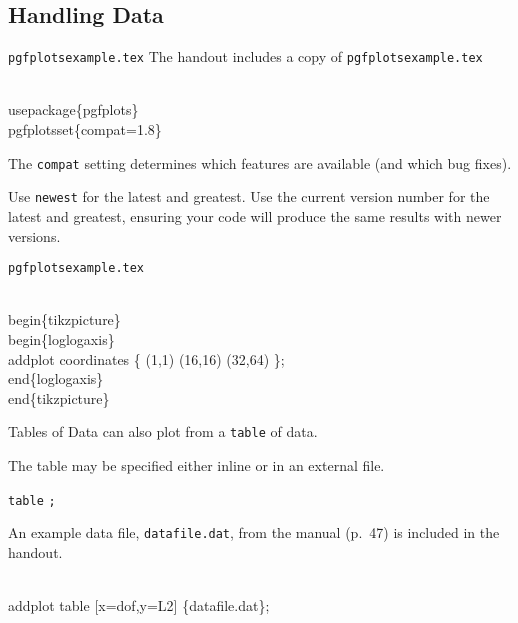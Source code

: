 \subsection{Handling Data}

\begin{frame}[fragile]{\texttt{pgfplotsexample.tex}}
  The handout includes a copy of \texttt{pgfplotsexample.tex}
  \begin{semiverbatim}
    \\usepackage\{pgfplots\}
    \\pgfplotsset\{compat=1.8\}
  \end{semiverbatim}
  The \verb|compat| setting determines which features are available (and which bug fixes).

  Use \verb|newest| for the latest and greatest.
%
  Use the current version number for the latest and greatest, ensuring your code will produce the same results with newer versions.
\end{frame}



\begin{frame}[fragile]{\texttt{pgfplotsexample.tex}}
  \begin{semiverbatim}
    \alert<2>{\\begin\{tikzpicture\}}
      \alert<3>{\\begin\{loglogaxis\}}
        \alert<4>{\\addplot} \alert<5>{coordinates} \alert<6>{\{
          (1,1)
          (16,16)
          (32,64)
        \}}\alert<7>{;}
      \alert<3>{\\end\{loglogaxis\}}
    \alert<2>{\\end\{tikzpicture\}}
  \end{semiverbatim}
\end{frame}

\begin{frame}[fragile]{Tables of Data}
  \pgfplots{} can also plot from a \verb|table| of data.

  The table may be specified either inline or in an external file.

   \alert<2,6>{\texttt{table}} \alert<3,7-9>{} \alert<4,10>{}\texttt{;}

  An example data file, \alert<10>{\texttt{datafile.dat}}, from the manual (p.~47) is included in the handout.

  \begin{semiverbatim}
    \\addplot \alert<6>{table} \alert<7>{[}\alert<7,8>{x=dof}\alert<7>{,}\alert<7,9>{y=L2}\alert<7>{]} \alert<10>{\{datafile.dat\}};
  \end{semiverbatim}

\end{frame}

